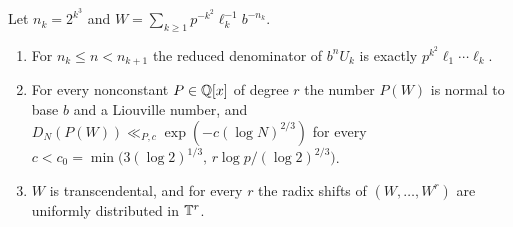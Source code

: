 \documentclass[11pt]{article}
\begin{document}
\begin{theorem}\label{thm:allprime}
Let $n_k=2^{k^3}$ and $W=\sum_{k\ge1}p^{-k^2}\ell_k^{-1}b^{-n_k}$.
\begin{enumerate}[label=\textup{(\roman*)},nosep]
\item For $n_k\le n<n_{k+1}$ the reduced denominator of $b^nU_k$ is exactly $p^{k^2}\ell_1\cdots\ell_k$.
\item For every nonconstant $P\in\mathbb Q[x]$ of degree $r$ the number $P(W)$ is normal to base $b$ and a Liouville number, and
$D_N(P(W))\ll_{P,c}\exp(-c(\log N)^{2/3})$ for every $c<c_0=\min\bigl(3(\log2)^{1/3},\,r\log p/(\log2)^{2/3}\bigr)$.
\item $W$ is transcendental, and for every $r$ the radix shifts of $(W,\ldots,W^r)$ are uniformly distributed in $\mathbb T^r$.
\end{enumerate}
\end{theorem}
\end{document}
